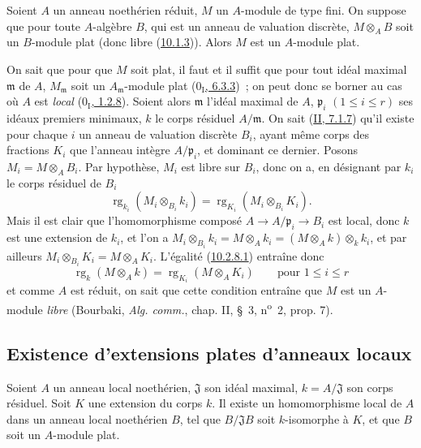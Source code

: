 \begin{proposition}[10.2.8]
\label{0.10.2.8-fr}
Soient $A$ un anneau noethérien réduit, $M$ un $A$-module de type fini. On
suppose que pour toute $A$-algèbre $B$, qui est un anneau de valuation
discrète, $M\otimes_A B$ soit un $B$-module plat (donc libre
(\hyperref[0.10.1.3-fr]{10.1.3})). Alors $M$ est un $A$-module plat.
\end{proposition}

On sait que pour que $M$ soit plat, il faut et il suffit que pour tout idéal
maximal $\mathfrak m$ de $A$, $M_{\mathfrak m}$ soit un
$A_{\mathfrak m}$-module plat
(\hyperref[0.6.3.3-fr]{$0_{\mathrm I}$, 6.3.3})~; on peut donc se borner au cas
où $A$ est \emph{local} (\hyperref[0.1.2.8-fr]{$0_{\mathrm I}$, 1.2.8}).
Soient alors $\mathfrak m$ l'idéal maximal de $A$, $\mathfrak p_i$
$(1\leq i\leq r)$ ses idéaux premiers minimaux, $k$ le corps résiduel
$A/\mathfrak m$. On sait (\hyperref[II.7.1.7-fr]{II, 7.1.7}) qu'il existe
pour chaque $i$ un anneau de valuation discrète $B_i$, ayant même corps des
fractions $K_i$ que l'anneau intègre $A/\mathfrak p_i$, et dominant ce
dernier. Posons $M_i=M\otimes_A B_i$. Par hypothèse, $M_i$ est libre sur
$B_i$, donc on a, en désignant par $k_i$ le corps résiduel de $B_i$
\[
\label{0.10.2.8.1-fr}
  \operatorname{rg}_{k_i}(M_i\otimes_{B_i}k_i)
  =\operatorname{rg}_{K_i}(M_i\otimes_{B_i}K_i).
  \tag{10.2.8.1}
\]
Mais il est clair que l'homomorphisme composé
$A\to A/\mathfrak p_i\to B_i$ est local, donc $k$ est une extension de $k_i$,
et l'on a
$M_i\otimes_{B_i}k_i=M\otimes_A k_i=(M\otimes_A k)\otimes_k k_i$, et par
ailleurs $M_i\otimes_{B_i}K_i=M\otimes_A K_i$. L'égalité
(\hyperref[0.10.2.8.1-fr]{10.2.8.1}) entraîne donc
\[
  \operatorname{rg}_k(M\otimes_A k)=\operatorname{rg}_{K_i}(M\otimes_A K_i)
  \qquad\text{pour }1\leq i\leq r
\]
et comme $A$ est réduit, on sait que cette condition entraîne que $M$ est un
$A$-module \emph{libre} (Bourbaki, \emph{Alg. comm.}, chap. II, \S~3,
n\textsuperscript{o}~2, prop. 7).

\subsection{Existence d'extensions plates d'anneaux locaux}
\label{subsection:0.10.3-fr}

\begin{proposition}[10.3.1]
\label{0.10.3.1-fr}
Soient $A$ un anneau local noethérien, $\mathfrak J$ son idéal maximal,
$k=A/\mathfrak J$ son corps résiduel. Soit $K$ une extension du corps $k$. Il
existe un homomorphisme local de $A$ dans un anneau local noethérien $B$, tel
que $B/\mathfrak J B$ soit $k$-isomorphe à $K$, et que $B$ soit un
$A$-module plat.
\end{proposition}

